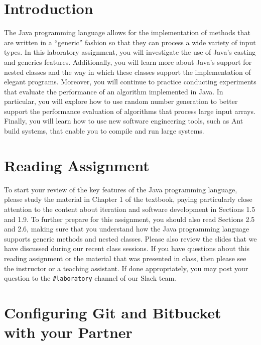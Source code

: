 

\usepackage[compact]{titlesec}



\section*{Introduction}

The Java programming language allows for the implementation of methods that are written in a ``generic'' fashion so that
they can process a wide variety of input types. In this laboratory assignment, you will investigate the use of Java's
casting and generics features. Additionally, you will learn more about Java's support for nested classes and the way in
which these classes support the implementation of elegant programs. Moreover, you will continue to practice conducting
experiments that evaluate the performance of an algorithm implemented in Java. In particular, you will explore how to
use random number generation to better support the performance evaluation of algorithms that process large input arrays.
Finally, you will learn how to use new software engineering tools, such as Ant build systems, that enable you to compile
and run large systems.

\section*{Reading Assignment}

To start your review of the key features of the Java programming language, please study the material in Chapter 1 of the
textbook, paying particularly close attention to the content about iteration and software development in Sections 1.5
and 1.9. To further prepare for this assignment, you should also read Sections 2.5 and 2.6, making sure that you
understand how the Java programming language supports generic methods and nested classes.  Please also review the slides
that we have discussed during our recent class sessions. If you have questions about this reading assignment or the
material that was presented in class, then please see the instructor or a teaching assistant. If done appropriately, you
may post your question to the {\tt \#laboratory} channel of our Slack team.

\section*{Configuring Git and Bitbucket with your Partner}

